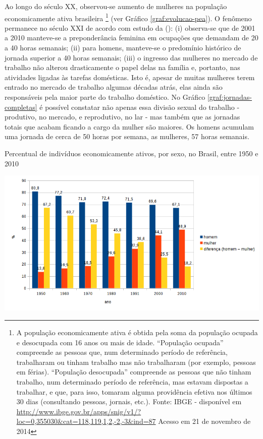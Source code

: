 Ao longo do século XX, observou-se aumento de mulheres na população economicamente ativa brasileira \footnote{A população economicamente ativa é obtida pela soma da população ocupada e desocupada com 16 anos ou mais de idade. ``População ocupada'' compreende as pessoas que, num determinado período de referência, trabalharam ou tinham trabalho mas não trabalharam (por exemplo, pessoas em férias). ``População desocupada'' compreende as pessoas que não tinham trabalho, num determinado período de referência, mas estavam dispostas a trabalhar, e que, para isso, tomaram alguma providência efetiva nos últimos 30 dias (consultando pessoas, jornais, etc.). Fonte: IBGE - disponível em \url{http://www.ibge.gov.br/apps/snig/v1/?loc=0,355030&cat=118,119,1,2,-2,-3&ind=87} Acesso em 21 de novembro de 2014} 
(ver Gráfico \ref{graf:evolucao-pea}). 
O fenômeno permanece no século XXI de acordo com estudo da  (\citeyear{ABRAMO2010}):
(i) observa-se que de 2001 a 2010 manteve-se a preponderância feminina em ocupações que demandam de 20 a 40 horas semanais;
(ii) para homens, manteve-se o predomínio histórico de jornada superior a 40 horas semanais;
(iii) o ingresso das mulheres no mercado de trabalho não alterou drasticamente o papel delas na família e, portanto, nas atividades ligadas às tarefas domésticas. Isto é, apesar de muitas mulheres terem entrado no mercado de trabalho algumas décadas atrás, elas ainda são responsáveis pela maior parte do trabalho doméstico. No Gráfico \ref{graf:jornadas-completas} é possível constatar não apenas essa divisão sexual do trabalho - produtivo, no mercado, e reprodutivo, no lar - mas também que as jornadas totais que acabam ficando a cargo da mulher são maiores. Os homens acumulam uma jornada de cerca de 50 horas por semana, as mulheres, 57 horas semanais.

\begin{grafico}[htb]%
    \caption{\label{graf:evolucao-pea}Percentual de indivíduos economicamente ativos, por sexo, no Brasil, entre 1950 e 2010}%
    \begin{center}%
        \includegraphics[width=1.05\textwidth]{./imagens/evolucao-pea1.png}%
    \end{center}%
\end{grafico}%

